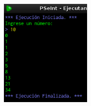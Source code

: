 \documentclass[12pt]{article}
\begin{document}
\begin{enumerate}
                \begin{figure}[!h]
                    \centering
                    \includegraphics[width=0.4\textwidth]{Img/Ejec_ej15.png}
                \end{figure}

        \end{enumerate}
\end{document}
